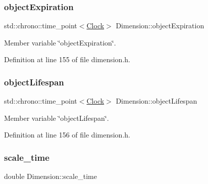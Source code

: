 \mbox{\label{class_dimension_ac2df45c101a97359cfe179636f62b0f2}} 
\subsubsection{\texorpdfstring{object\+Expiration}{objectExpiration}}
{\footnotesize\ttfamily std\+::chrono\+::time\+\_\+point$<$\hyperlink{universe_8h_a0ef8d951d1ca5ab3cfaf7ab4c7a6fd80}{Clock}$>$ Dimension\+::object\+Expiration\hspace{0.3cm}{\ttfamily [protected]}}



Member variable \char`\"{}object\+Expiration\char`\"{}. 



Definition at line 155 of file dimension.\+h.

\mbox{\label{class_dimension_a249074ae65a06cb5386baf196bdee022}} 
\subsubsection{\texorpdfstring{object\+Lifespan}{objectLifespan}}
{\footnotesize\ttfamily std\+::chrono\+::time\+\_\+point$<$\hyperlink{universe_8h_a0ef8d951d1ca5ab3cfaf7ab4c7a6fd80}{Clock}$>$ Dimension\+::object\+Lifespan\hspace{0.3cm}{\ttfamily [protected]}}



Member variable \char`\"{}object\+Lifespan\char`\"{}. 



Definition at line 156 of file dimension.\+h.

\mbox{\label{class_dimension_ad3ba9c1c332756658b1e711c447831a3}} 
\subsubsection{\texorpdfstring{scale\+\_\+time}{scale\_time}}
{\footnotesize\ttfamily double Dimension\+::scale\+\_\+time\hspace{0.3cm}{\ttfamily [protected]}}




